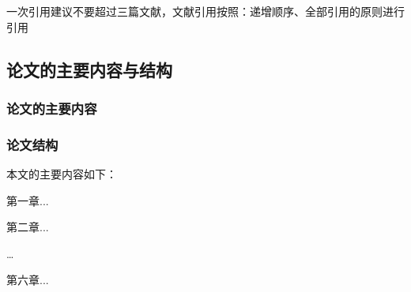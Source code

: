 一次引用建议不要超过三篇文献，文献引用按照：递增顺序、全部引用的原则进行引用

\subsection{论文的主要内容与结构}
\subsubsection{论文的主要内容}

\subsubsection{论文结构}
本文的主要内容如下：

第一章...

第二章...

\dots

第六章...






